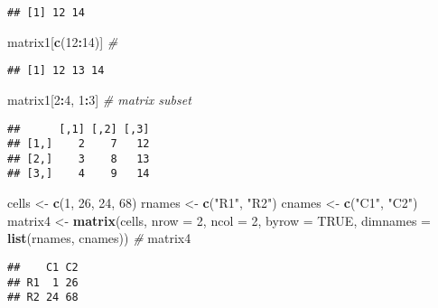 \documentclass[]{article}
\newenvironment{Shaded}{\begin{snugshade}}{\end{snugshade}}
\newcommand{\KeywordTok}[1]{\textcolor[rgb]{0.13,0.29,0.53}{\textbf{#1}}}
\newcommand{\DataTypeTok}[1]{\textcolor[rgb]{0.13,0.29,0.53}{#1}}
\newcommand{\DecValTok}[1]{\textcolor[rgb]{0.00,0.00,0.81}{#1}}
\newcommand{\StringTok}[1]{\textcolor[rgb]{0.31,0.60,0.02}{#1}}
\newcommand{\CommentTok}[1]{\textcolor[rgb]{0.56,0.35,0.01}{\textit{#1}}}
\newcommand{\OtherTok}[1]{\textcolor[rgb]{0.56,0.35,0.01}{#1}}
\newcommand{\OperatorTok}[1]{\textcolor[rgb]{0.81,0.36,0.00}{\textbf{#1}}}
\newcommand{\NormalTok}[1]{#1}
\begin{document}
\begin{verbatim}
## [1] 12 14
\end{verbatim}

\begin{Shaded}
\begin{Highlighting}[]
\NormalTok{matrix1[}\KeywordTok{c}\NormalTok{(}\DecValTok{12}\OperatorTok{:}\DecValTok{14}\NormalTok{)] }\CommentTok{#}
\end{Highlighting}
\end{Shaded}

\begin{verbatim}
## [1] 12 13 14
\end{verbatim}

\begin{Shaded}
\begin{Highlighting}[]
\NormalTok{matrix1[}\DecValTok{2}\OperatorTok{:}\DecValTok{4}\NormalTok{, }\DecValTok{1}\OperatorTok{:}\DecValTok{3}\NormalTok{] }\CommentTok{# matrix subset}
\end{Highlighting}
\end{Shaded}

\begin{verbatim}
##      [,1] [,2] [,3]
## [1,]    2    7   12
## [2,]    3    8   13
## [3,]    4    9   14
\end{verbatim}

\begin{Shaded}
\begin{Highlighting}[]
\NormalTok{cells <-}\StringTok{ }\KeywordTok{c}\NormalTok{(}\DecValTok{1}\NormalTok{, }\DecValTok{26}\NormalTok{, }\DecValTok{24}\NormalTok{, }\DecValTok{68}\NormalTok{)}
\NormalTok{rnames <-}\StringTok{ }\KeywordTok{c}\NormalTok{(}\StringTok{"R1"}\NormalTok{, }\StringTok{"R2"}\NormalTok{)}
\NormalTok{cnames <-}\StringTok{ }\KeywordTok{c}\NormalTok{(}\StringTok{"C1"}\NormalTok{, }\StringTok{"C2"}\NormalTok{) }
\NormalTok{matrix4 <-}\StringTok{ }\KeywordTok{matrix}\NormalTok{(cells, }\DataTypeTok{nrow =} \DecValTok{2}\NormalTok{, }\DataTypeTok{ncol =} \DecValTok{2}\NormalTok{, }\DataTypeTok{byrow =} \OtherTok{TRUE}\NormalTok{,}
  \DataTypeTok{dimnames =} \KeywordTok{list}\NormalTok{(rnames, cnames)) }\CommentTok{# }
\NormalTok{matrix4}
\end{Highlighting}
\end{Shaded}

\begin{verbatim}
##    C1 C2
## R1  1 26
## R2 24 68
\end{verbatim}
\end{document}
